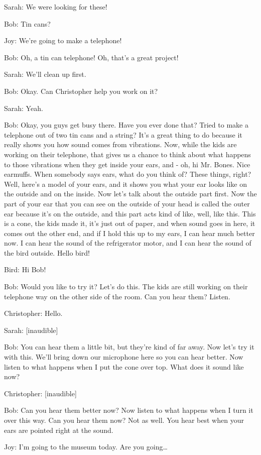 Sarah: We were looking for these!

Bob: Tin cans?

Joy: We're going to make a telephone!

Bob: Oh, a tin can telephone! Oh, that's a great project!

Sarah: We'll clean up first.

Bob: Okay. Can Christopher help you work on it?

Sarah: Yeah.

Bob: Okay, you guys get busy there. Have you ever done that? Tried to make a telephone out of two tin cans and a string? It's a great thing to do because it really shows you how sound comes from vibrations. Now, while the kids are working on their telephone, that gives us a chance to think about what happens to those vibrations when they get inside your ears, and - oh, hi Mr. Bones. Nice earmuffs. When somebody says ears, what do you think of? These things, right? Well, here's a model of your ears, and it shows you what your ear looks like on the outside and on the inside. Now let's talk about the outside part first. Now the part of your ear that you can see on the outside of your head is called the outer ear because it's on the outside, and this part acts kind of like, well, like this. This is a cone, the kids made it, it's just out of paper, and when sound goes in here, it comes out the other end, and if I hold this up to my ears, I can hear much better now. I can hear the sound of the refrigerator motor, and I can hear the sound of the bird outside. Hello bird!

Bird: Hi Bob!

Bob: Would you like to try it? Let's do this. The kids are still working on their telephone way on the other side of the room. Can you hear them? Listen.

Christopher: Hello.

Sarah: [inaudible]

Bob: You can hear them a little bit, but they're kind of far away. Now let's try it with this. We'll bring down our microphone here so you can hear better. Now listen to what happens when I put the cone over top. What does it sound like now?

Christopher: [inaudible]

Bob: Can you hear them better now? Now listen to what happens when I turn it over this way. Can you hear them now? Not as well. You hear best when your ears are pointed right at the sound.

Joy: I'm going to the museum today. Are you going\dots

